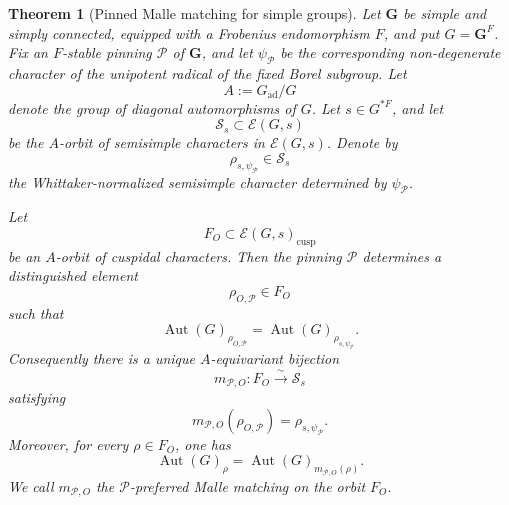 \documentclass[10pt,a4paper]{amsart}
\newtheorem{theorem}{Theorem}
\newcommand{\Aut}{\operatorname{Aut}}
\newcommand{\ad}{\operatorname{ad}}
\newcommand{\cE}{\mathcal{E}}
\newcommand{\cP}{\mathcal{P}}
\newcommand{\cusp}{\operatorname{cusp}}
\begin{document}
\begin{theorem}[Pinned Malle matching for simple groups]
\label{thm:pinned-Malle-matching-simple}
Let \(\mathbf G\) be simple and simply connected, equipped with a Frobenius
endomorphism \(F\), and put \(G=\mathbf G^F\).  Fix an \(F\)-stable pinning
\(\cP\) of \(\mathbf G\), and let \(\psi_{\cP}\) be the corresponding
non-degenerate character of the unipotent radical of the fixed Borel subgroup.
Let
\[
        A:=G_{\ad}/G
\]
denote the group of diagonal automorphisms of \(G\).  Let
\(s\in G^{*F}\), and let
\[
        \mathcal S_s\subset \cE(G,s)
\]
be the \(A\)-orbit of semisimple characters in \(\cE(G,s)\).  Denote by
\[
        \rho_{s,\psi_{\cP}}\in \mathcal S_s
\]
the Whittaker-normalized semisimple character determined by \(\psi_{\cP}\).

Let
\[
        F_O\subset \cE(G,s)_{\cusp}
\]
be an \(A\)-orbit of cuspidal characters.  Then the pinning \(\cP\) determines
a distinguished element
\[
        \rho_{O,\cP}\in F_O
\]
such that
\[
        \Aut(G)_{\rho_{O,\cP}}
        =
        \Aut(G)_{\rho_{s,\psi_{\cP}}}.
\]
Consequently there is a unique \(A\)-equivariant bijection
\[
        m_{\cP,O}:F_O\xrightarrow{\sim}\mathcal S_s
\]
satisfying
\[
        m_{\cP,O}(\rho_{O,\cP})=\rho_{s,\psi_{\cP}}.
\]
Moreover, for every \(\rho\in F_O\), one has
\[
        \Aut(G)_\rho
        =
        \Aut(G)_{m_{\cP,O}(\rho)}.
\]
We call \(m_{\cP,O}\) the \(\cP\)-preferred Malle matching on the orbit \(F_O\).
\end{theorem}
\end{document}
